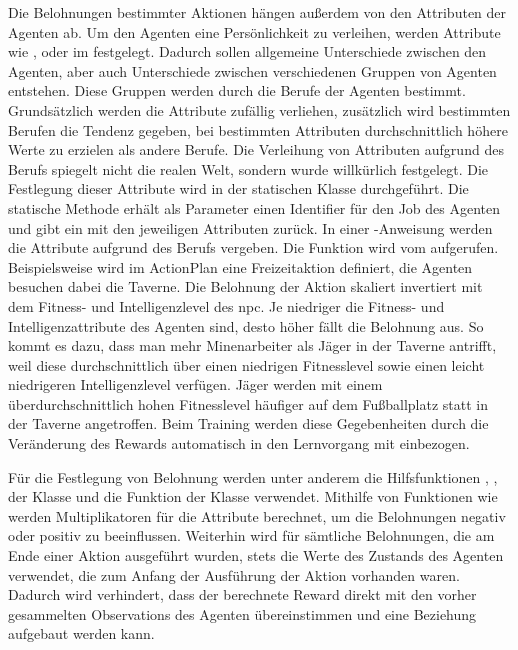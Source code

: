 Die Belohnungen bestimmter Aktionen hängen außerdem von den Attributen der Agenten ab. Um den Agenten eine Persönlichkeit zu verleihen, werden Attribute wie ,  oder  im  festgelegt.
Dadurch sollen allgemeine Unterschiede zwischen den Agenten, aber auch Unterschiede zwischen verschiedenen Gruppen von Agenten entstehen. Diese Gruppen werden durch die Berufe der Agenten bestimmt. Grundsätzlich werden die Attribute zufällig verliehen, zusätzlich wird bestimmten Berufen die Tendenz gegeben, bei bestimmten Attributen durchschnittlich höhere Werte zu erzielen als andere Berufe. Die Verleihung von Attributen aufgrund des Berufs spiegelt nicht die realen Welt, sondern wurde willkürlich festgelegt. Die Festlegung dieser Attribute wird in der statischen Klasse  durchgeführt. Die statische Methode  erhält als Parameter einen Identifier für den Job des Agenten und gibt ein  mit den jeweiligen Attributen zurück. In einer -Anweisung werden die Attribute aufgrund des Berufs vergeben. Die Funktion wird vom  aufgerufen.
Beispielsweise wird im ActionPlan  eine Freizeitaktion definiert, die Agenten besuchen dabei die Taverne. Die Belohnung der Aktion skaliert invertiert mit dem Fitness- und Intelligenzlevel des \ac{npc}. Je niedriger die Fitness- und Intelligenzattribute des Agenten sind, desto höher fällt die Belohnung aus. So kommt es dazu, dass man mehr Minenarbeiter als Jäger in der Taverne antrifft, weil diese durchschnittlich über einen niedrigen Fitnesslevel sowie einen leicht niedrigeren Intelligenzlevel verfügen. Jäger werden mit einem überdurchschnittlich hohen Fitnesslevel häufiger auf dem Fußballplatz statt in der Taverne angetroffen. Beim Training werden diese Gegebenheiten durch die Veränderung des Rewards automatisch in den Lernvorgang mit einbezogen.

Für die Festlegung von Belohnung werden unter anderem die Hilfsfunktionen , ,  der Klasse  und die Funktion  der Klasse  verwendet. Mithilfe von Funktionen wie  werden Multiplikatoren für die Attribute berechnet, um die Belohnungen negativ oder positiv zu beeinflussen.
Weiterhin wird für sämtliche Belohnungen, die am Ende einer Aktion ausgeführt wurden, stets die Werte des Zustands des Agenten verwendet, die zum Anfang der Ausführung der Aktion vorhanden waren. Dadurch wird verhindert, dass der berechnete Reward direkt mit den vorher gesammelten Observations des Agenten übereinstimmen und eine Beziehung aufgebaut werden kann.











